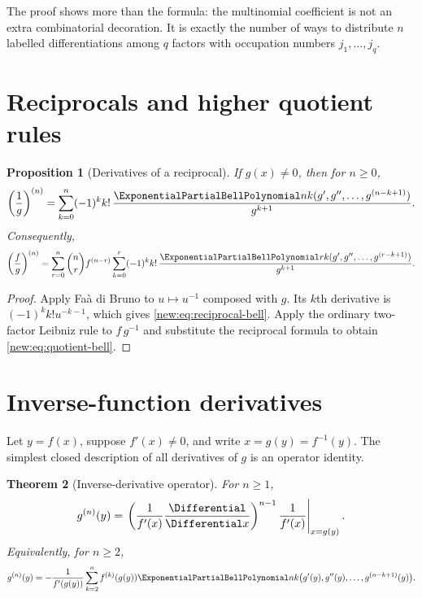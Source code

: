 \documentclass[11pt,a4paper,oneside,openany]{book}
\newtheorem{theorem}{Theorem}[chapter]
\newtheorem{proposition}[theorem]{Proposition}
\theoremstyle{definition}
\theoremstyle{remark}
\begin{document}
The proof shows more than the formula: the multinomial coefficient is not an
extra combinatorial decoration.  It is exactly the number of ways to distribute
$n$ labelled differentiations among $q$ factors with occupation numbers
$j_1,\ldots,j_q$.

\section{Reciprocals and higher quotient rules}

\begin{proposition}[Derivatives of a reciprocal]
If $g(x)\ne0$, then for $n\ge0$,
\begin{equation}
 \left(\frac1g\right)^{(n)}
 =\sum_{k=0}^n(-1)^k k!\,
   \frac{\ExponentialPartialBellPolynomial nk(g',g'',\ldots,g^{(n-k+1)})}{g^{k+1}}.
 \label{new:eq:reciprocal-bell}
\end{equation}
Consequently,
\begin{equation}
 \left(\frac fg\right)^{(n)}
 =\sum_{r=0}^n\binom nr f^{(n-r)}
   \sum_{k=0}^{r}(-1)^k k!\,
   \frac{\ExponentialPartialBellPolynomial rk(g',g'',\ldots,g^{(r-k+1)})}{g^{k+1}}.
 \label{new:eq:quotient-bell}
\end{equation}
\end{proposition}

\begin{proof}
Apply Fa\`a di Bruno to $u\mapsto u^{-1}$ composed with $g$.  Its $k$th
derivative is $(-1)^k k!u^{-k-1}$, which gives
\eqref{new:eq:reciprocal-bell}.  Apply the ordinary two-factor Leibniz rule to
$f\,g^{-1}$ and substitute the reciprocal formula to obtain
\eqref{new:eq:quotient-bell}.
\end{proof}

\section{Inverse-function derivatives}

Let $y=f(x)$, suppose $f'(x)\ne0$, and write $x=g(y)=f^{-1}(y)$.  The simplest
closed description of all derivatives of $g$ is an operator identity.

\begin{theorem}[Inverse-derivative operator]
For $n\ge1$,
\begin{equation}
 g^{(n)}(y)
 =\left.
   \left(\frac1{f'(x)}\frac{\Differential}{\Differential x}\right)^{n-1}
   \frac1{f'(x)}\right|_{x=g(y)}.
 \label{new:eq:inverse-operator}
\end{equation}
Equivalently, for $n\ge2$,
\begin{equation}
 g^{(n)}(y)=-\frac1{f'(g(y))}
 \sum_{k=2}^{n} f^{(k)}(g(y))
 \ExponentialPartialBellPolynomial nk\bigl(g'(y),g''(y),\ldots,g^{(n-k+1)}(y)\bigr).
 \label{new:eq:inverse-recursion}
\end{equation}
\end{theorem}
\end{document}
